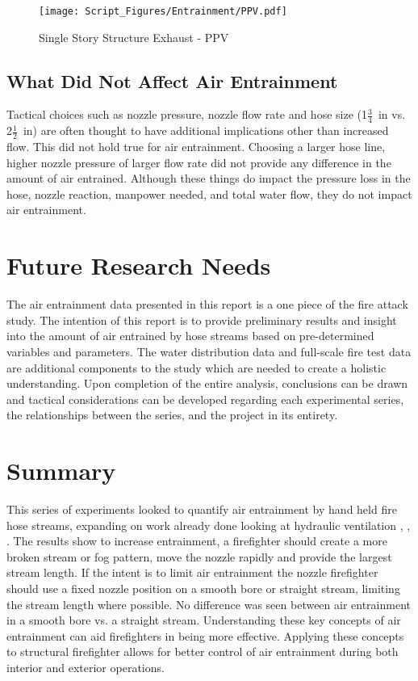 \documentclass[12pt,oneside]{book}
\begin{document}
\begin{figure}[!ht]
\centering
\texttt{[image: Script\_Figures/Entrainment/PPV.pdf]}
\caption[Single Story Structure Exhaust - PPV]{Single Story Structure Exhaust - PPV \cite{Zevotek_Kerber:2016}}
\label{fig:PPV}
\end{figure}

\section{What Did Not Affect Air Entrainment}
Tactical choices such as nozzle pressure, nozzle flow rate and hose size (1$\frac{3}{4}$~in vs. 2$\frac{1}{2}$~in) are often thought to have additional implications other than increased flow. This did not hold true for air entrainment. Choosing a larger hose line, higher nozzle pressure of larger flow rate did not provide any difference in the amount of air entrained. Although these things do impact the pressure loss in the hose, nozzle reaction, manpower needed, and total water flow, they do not impact air entrainment.

\chapter{Future Research Needs}

The air entrainment data presented in this report is a one piece of the fire attack study. The intention of this report is to provide preliminary results and insight into the amount of air entrained by hose streams based on pre-determined variables and parameters. The water distribution data and full-scale fire test data are additional components to the study which are needed to create a holistic understanding. Upon completion of the entire analysis, conclusions can be drawn and tactical considerations can be developed regarding each experimental series, the relationships between the series, and the project in its entirety.  

\chapter{Summary}

This series of experiments looked to quantify air entrainment by hand held fire hose streams, expanding on work already done looking at hydraulic ventilation \cite{KnappNozzles1}, \cite{KnappNozzles2}, \cite{KnappNozzles3}. The results show to increase entrainment, a firefighter should create a more broken stream or fog pattern, move the nozzle rapidly and provide the largest stream length. If the intent is to limit air entrainment the nozzle firefighter should use a fixed nozzle position on a smooth bore or straight stream, limiting the stream length where possible.  No difference was seen between air entrainment in a smooth bore vs. a straight stream. Understanding these key concepts of air entrainment can aid firefighters in being more effective. Applying these concepts to structural firefighter allows for better control of air entrainment during both interior and exterior operations. 
\end{document}
